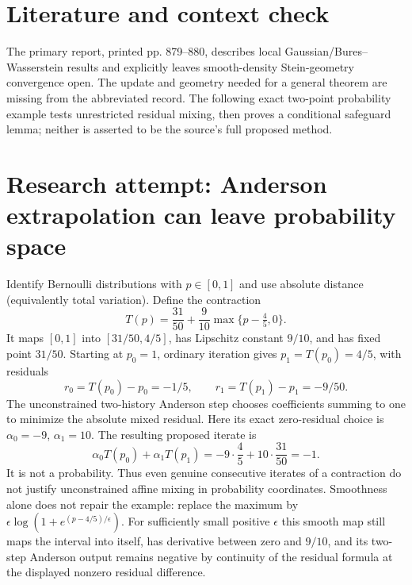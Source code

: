 \documentclass[11pt]{article}
\begin{document}
\section{Literature and context check}
The primary report, printed pp. 879--880, describes local Gaussian/Bures--Wasserstein results and explicitly leaves smooth-density Stein-geometry convergence open. The update and geometry needed for a general theorem are missing from the abbreviated record. The following exact two-point probability example tests unrestricted residual mixing, then proves a conditional safeguard lemma; neither is asserted to be the source's full proposed method.
\section{Research attempt: Anderson extrapolation can leave probability space}

Identify Bernoulli distributions with $p\in[0,1]$ and use absolute distance (equivalently total variation). Define the contraction
\[
T(p)=\frac{31}{50}+\frac9{10}\max\{p-\tfrac45,0\}.
\]
It maps $[0,1]$ into $[31/50,4/5]$, has Lipschitz constant $9/10$, and has fixed point $31/50$. Starting at $p_0=1$, ordinary iteration gives $p_1=T(p_0)=4/5$, with residuals
\[
r_0=T(p_0)-p_0=-1/5,\qquad
r_1=T(p_1)-p_1=-9/50.
\]
The unconstrained two-history Anderson step chooses coefficients summing to one to minimize the absolute mixed residual. Here its exact zero-residual choice is $\alpha_0=-9$, $\alpha_1=10$. The resulting proposed iterate is
\[
\alpha_0T(p_0)+\alpha_1T(p_1)
=-9\cdot\frac45+10\cdot\frac{31}{50}=-1.
\]
It is not a probability. Thus even genuine consecutive iterates of a contraction do not justify unconstrained affine mixing in probability coordinates. Smoothness alone does not repair the example: replace the maximum by $\epsilon\log(1+e^{(p-4/5)/\epsilon})$. For sufficiently small positive $\epsilon$ this smooth map still maps the interval into itself, has derivative between zero and $9/10$, and its two-step Anderson output remains negative by continuity of the residual formula at the displayed nonzero residual difference.
\end{document}
